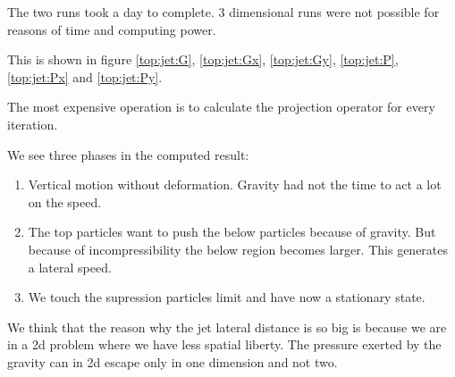 The two runs took a day to complete. 3 dimensional runs were not possible for reasons of time and
computing power.

This is shown in figure \ref{top:jet:G}, \ref{top:jet:Gx}, \ref{top:jet:Gy}, \ref{top:jet:P}, \ref{top:jet:Px} and
\ref{top:jet:Py}.

The most expensive operation is to calculate the projection operator for every iteration.

We see three phases in the computed result:
\begin{enumerate}
 \item Vertical motion without deformation. Gravity had not the time to act a lot on the speed.
 \item The top particles want to push the below particles because of gravity.
 But because of incompressibility the below region becomes larger. This generates
 a lateral speed.
 \item We touch the supression particles limit and have now a stationary state.
\end{enumerate}

We think that the reason why the jet lateral distance is so big is because we are in a 2d problem where
we have less spatial liberty. The pressure exerted by the gravity can in 2d escape only in one dimension
and not two.

